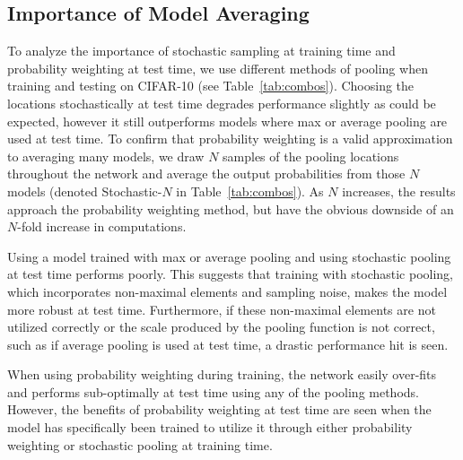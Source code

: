 \documentclass{article} %
\newcommand{\tab}[1]{Table~\ref{tab:#1}}
\begin{document}
\subsection{Importance of Model Averaging} \label{sec:averaging}
\vspace{-1mm}
To analyze the importance of stochastic sampling at training time and
probability weighting at test time, we use different methods of
pooling when training and testing on CIFAR-10 (see
\tab{combos}). Choosing the locations stochastically at test time
degrades performance slightly as could be expected, however it still
outperforms models where max or average pooling are used at test
time. To confirm that probability weighting is a valid approximation to averaging many models, we draw $N$ samples
of the pooling locations throughout the network and average the output probabilities from those $N$
models (denoted Stochastic-$N$ in \tab{combos}). As $N$ increases, the results approach the
probability weighting method, but have the obvious downside of an $N$-fold increase in computations.

Using a model trained with max or average
pooling and using stochastic pooling at test time performs
poorly. This suggests that training with stochastic pooling, which
incorporates non-maximal elements and sampling noise, makes the model
more robust at test time. Furthermore, if these non-maximal elements
are not utilized correctly or the scale produced by the pooling
function is not correct, such as if average pooling is used at test
time, a drastic performance hit is seen.

When using probability weighting during training, the network easily
over-fits and performs sub-optimally at test time using any of the
pooling methods. However, the benefits of probability
weighting at test time are seen when the model has specifically
been trained to utilize it through either probability weighting or
stochastic pooling at training time.
\end{document}
